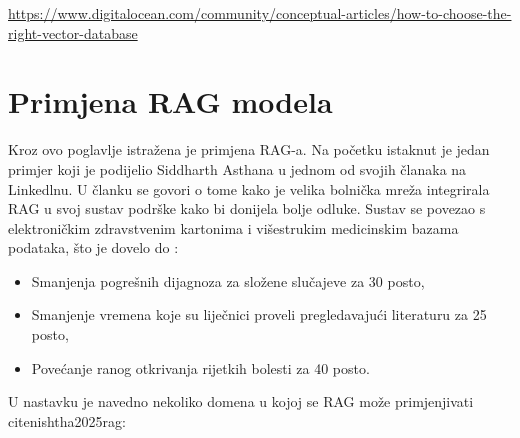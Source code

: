 \documentclass[]{foi}
\begin{document}
\url{https://www.digitalocean.com/community/conceptual-articles/how-to-choose-the-right-vector-database}

\section{Primjena RAG modela}

Kroz ovo poglavlje istražena je primjena RAG-a. Na početku istaknut je jedan primjer koji je podijelio Siddharth Asthana u jednom od svojih
članaka na Linkedlnu. U članku se govori o tome kako je velika bolnička mreža integrirala RAG u svoj sustav podrške kako bi donijela bolje odluke.
Sustav se povezao s elektroničkim zdravstvenim kartonima i višestrukim medicinskim bazama podataka, što je dovelo do \cite{siddharth2025rag}:
\begin{itemize}
    \item Smanjenja pogrešnih dijagnoza za složene slučajeve za 30 posto,
    \item Smanjenje vremena koje su liječnici proveli pregledavajući literaturu za 25 posto,
    \item Povećanje ranog otkrivanja rijetkih bolesti za 40 posto.
\end{itemize}

U nastavku je navedno nekoliko domena u kojoj se RAG može primjenjivati cite{nishtha2025rag}:
\end{document}
